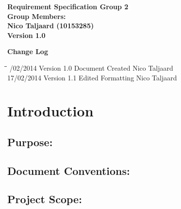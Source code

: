\documentclass[12pt]{article}
\newcommand{\Title}{Requirement Specification} %
\begin{document}
\vspace{4em}

\begin{center}%

  \LARGE \bf \Title
  \LARGE {\bf Group 2}\\[2em]
  \LARGE {\bf Group Members:}\\[1em]
  \large
      Nico Taljaard			(10153285)\\[6em]
      
      {\bf Version 1.0}
    
\end{center}%

\newpage
	{\LARGE \bf Change Log}\\[2em]
	
	\begin{tabbing}
		\hspace*{3cm}\=\hspace*{3cm}\=\hspace*{8cm}\=\hspace*{3cm} /02/2014 \> Version 1.0 \> Document Created \> Nico Taljaard\\
		17/02/2014 \> Version 1.1 \> Edited Formatting \> Nico Taljaard\\
	\end{tabbing}

\newpage
	\tableofcontents	
	
\newpage
	\section{Introduction}
	
	\vspace{0.2in}

		\subsection{Purpose:} %
		\vspace{0.1in}
		
	
	\vspace{0.2in}
	
		\subsection{Document Conventions:} %
		\vspace{0.1in}
		
	
	\vspace{0.2in}
	
		\subsection{Project Scope:}
		\vspace{0.1in}
		
\end{document}

